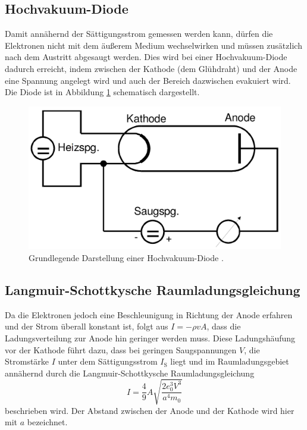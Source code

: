 \subsection{Hochvakuum-Diode}
Damit annähernd der Sättigungsstrom gemessen werden kann, dürfen die Elektronen nicht mit dem äußerem Medium wechselwirken und müssen zusätzlich nach dem Austritt abgesaugt werden. Dies wird bei einer Hochvakuum-Diode dadurch erreicht, indem zwischen der Kathode (dem Glühdraht) und der Anode eine Spannung angelegt wird und auch der Bereich dazwischen evakuiert wird. Die Diode ist in Abbildung \ref{fig:Hochvakuum-Diode} schematisch dargestellt.
\begin{figure}
	\centering
	\includegraphics[width=\linewidth-150pt,height=\textheight-150pt,keepaspectratio]{content/Bilder/Hochvakuum-Diode.png}
	\caption{Grundlegende Darstellung einer Hochvakuum-Diode \cite{V504}.}
	\label{fig:Hochvakuum-Diode}
\end{figure}

\subsection{Langmuir-Schottkysche Raumladungsgleichung}
Da die Elektronen jedoch eine Beschleunigung in Richtung der Anode erfahren und der Strom überall konstant ist, folgt aus $I = -\rho v A $, dass die Ladungsverteilung zur Anode hin geringer werden muss. Diese Ladungshäufung vor der Kathode führt dazu, dass bei geringen Saugspannungen $V$, die Stromstärke $I$ unter dem Sättigungsstrom $I_\text{S}$ liegt und im Raumladungsgebiet annähernd durch die Langmuir-Schottkysche Raumladungsgleichung 
\begin{equation}
	I = \frac{4}{9} A \sqrt{\frac{2 e_0^3 V^3}{a^4 m_0} } \label{eq:Langmuir-Schottkysche_Raumladungsgleichung}
\end{equation} 
beschrieben wird. Der Abstand zwischen der Anode und der Kathode wird hier mit $a$ bezeichnet.

